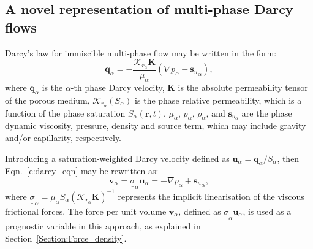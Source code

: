 \documentclass[times]{fldauth}
\begin{document}
\subsection{A novel representation of multi-phase Darcy flows}
Darcy's law for immiscible multi-phase flow may be written in the form:
\begin{equation}\label{e:darcy_eqn}
  \mathbf{q}_{\alpha} =
  -\frac{\mathcal{K}_{{r}_\alpha}\mathbf{K}}{\mu_{\alpha}}\left(
  \nabla p_{\alpha} - {\mathbf{s}_{u}}_{\alpha} \right),
\end{equation}
where $\mathbf{q}_{\alpha}$ is the $\alpha$-th phase Darcy velocity,
$\mathbf{K}$ is the absolute permeability tensor of the porous medium,
$\mathcal{K}_{{r}_\alpha}\left(S_{\alpha}\right)$ is the phase
relative permeability, which is a function of the phase saturation
$S_{\alpha}\left(\mathbf{r},t\right)$. $\mu_{\alpha}$, $p_{\alpha}$,
$\rho_{\alpha}$, and $\mathbf{s}_{{u}_\alpha}$ are the phase dynamic
viscosity, pressure, density and source term, which may include gravity and/or
capillarity, respectively. 

Introducing a saturation-weighted Darcy velocity defined as
$\mathbf{u}_\alpha= \mathbf{q}_\alpha/S_\alpha$, then
Eqn.~\ref{e:darcy_eqn} may be rewritten as:
\begin{equation}
  \mathbf{v}_\alpha={\underline {\underline \sigma}}_{\alpha}
  \mathbf{u}_{\alpha} = - \nabla p_{\alpha} +
         {\mathbf{s}_{u}}_{\alpha},
  \label{force-bal}
\end{equation}
where ${\underline {\underline \sigma}}_{\alpha}=\mu_\alpha S_\alpha
\left(\mathcal{K}_{{r}_\alpha}\mathbf{K}\right)^{-1}$ represents the
implicit linearisation of the viscous frictional forces. The force per
unit volume $\mathbf{v}_\alpha$, defined as ${\underline {\underline
    \sigma}}_{\alpha} \mathbf{u}_\alpha$, is used as a prognostic
variable in this approach, as explained in
Section~\ref{Section:Force_density}.
\end{document}
